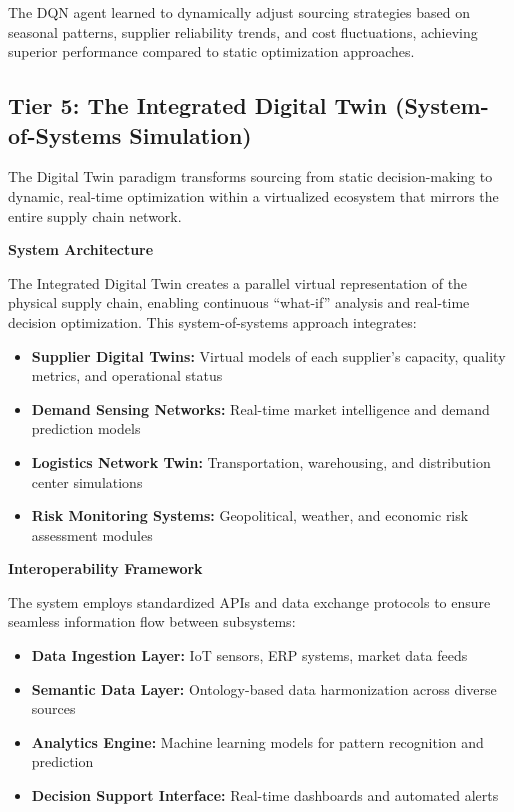 \documentclass{article}
\begin{document}
The DQN agent learned to dynamically adjust sourcing strategies based on seasonal patterns, supplier reliability trends, and cost fluctuations, achieving superior performance compared to static optimization approaches.

\subsection{Tier 5: The Integrated Digital Twin (System-of-Systems Simulation)}

The Digital Twin paradigm transforms sourcing from static decision-making to dynamic, real-time optimization within a virtualized ecosystem that mirrors the entire supply chain network.

\textbf{System Architecture}

The Integrated Digital Twin creates a parallel virtual representation of the physical supply chain, enabling continuous ``what-if'' analysis and real-time decision optimization. This system-of-systems approach integrates:

\begin{itemize}
\item \textbf{Supplier Digital Twins:} Virtual models of each supplier's capacity, quality metrics, and operational status
\item \textbf{Demand Sensing Networks:} Real-time market intelligence and demand prediction models
\item \textbf{Logistics Network Twin:} Transportation, warehousing, and distribution center simulations
\item \textbf{Risk Monitoring Systems:} Geopolitical, weather, and economic risk assessment modules
\end{itemize}

\textbf{Interoperability Framework}

The system employs standardized APIs and data exchange protocols to ensure seamless information flow between subsystems:

\begin{itemize}
\item \textbf{Data Ingestion Layer:} IoT sensors, ERP systems, market data feeds
\item \textbf{Semantic Data Layer:} Ontology-based data harmonization across diverse sources
\item \textbf{Analytics Engine:} Machine learning models for pattern recognition and prediction
\item \textbf{Decision Support Interface:} Real-time dashboards and automated alerts
\end{itemize}
\end{document}
